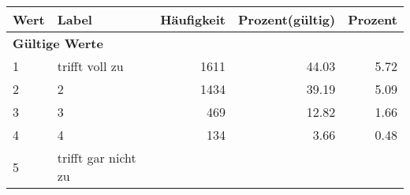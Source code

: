      \begin{longtable}{lXrrr}
     \toprule
     \textbf{Wert} & \textbf{Label} & \textbf{Häufigkeit} & \textbf{Prozent(gültig)} & \textbf{Prozent} \\
     \endhead
     \midrule
     \multicolumn{5}{l}{\textbf{Gültige Werte}}\\

     1 &
     \multicolumn{1}{X}{ trifft voll zu   } &


       \num{1611} &
       \num[round-mode=places,round-precision=2]{44,03} &
         \num[round-mode=places,round-precision=2]{5,72} \\

     2 &
     \multicolumn{1}{X}{ 2   } &


       \num{1434} &
       \num[round-mode=places,round-precision=2]{39,19} &
         \num[round-mode=places,round-precision=2]{5,09} \\

     3 &
     \multicolumn{1}{X}{ 3   } &


       \num{469} &
       \num[round-mode=places,round-precision=2]{12,82} &
         \num[round-mode=places,round-precision=2]{1,66} \\

     4 &
     \multicolumn{1}{X}{ 4   } &


       \num{134} &
       \num[round-mode=places,round-precision=2]{3,66} &
         \num[round-mode=places,round-precision=2]{0,48} \\

     5 &
     \multicolumn{1}{X}{ trifft gar nicht zu   } &



\end{longtable}
